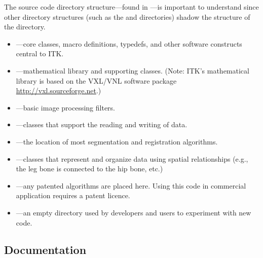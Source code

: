 The source code directory structure---found in ---is 
important to understand since other directory structures (such as the
 and  directories) shadow the structure of the
 directory.
\begin{itemize}
        \item {}---core classes, macro definitions,
        typedefs, and other software constructs central to ITK.
        \item {}---mathematical library and
        supporting classes. (Note: ITK's mathematical library is based
        on the VXL/VNL software package \url{http://vxl.sourceforge.net}.)
        \item {}---basic image processing
        filters.
        \item {}---classes that support the reading
        and writing of data.
        \item {}---the location of most 
        segmentation and registration algorithms.
        \item {}---classes that represent
        and organize data using spatial relationships (e.g., the leg bone
        is connected to the hip bone, etc.)
        \item {}---any patented algorithms are
        placed here. Using this code in commercial application requires
        a patent licence.
        \item {}---an empty directory used by developers
        and users to experiment with new code.
\end{itemize}

\subsection{Documentation}
\label{sec:Documentation}

